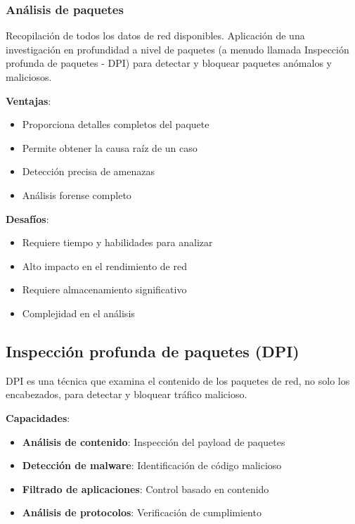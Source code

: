 \subsubsection{Análisis de paquetes}

Recopilación de todos los datos de red disponibles. Aplicación de una investigación en profundidad a nivel de paquetes (a menudo llamada Inspección profunda de paquetes - DPI) para detectar y bloquear paquetes anómalos y maliciosos.

\textbf{Ventajas}:
\begin{itemize}
    \item Proporciona detalles completos del paquete
    \item Permite obtener la causa raíz de un caso
    \item Detección precisa de amenazas
    \item Análisis forense completo
\end{itemize}

\textbf{Desafíos}:
\begin{itemize}
    \item Requiere tiempo y habilidades para analizar
    \item Alto impacto en el rendimiento de red
    \item Requiere almacenamiento significativo
    \item Complejidad en el análisis
\end{itemize}

\subsection{Inspección profunda de paquetes (DPI)}

DPI es una técnica que examina el contenido de los paquetes de red, no solo los encabezados, para detectar y bloquear tráfico malicioso.

\textbf{Capacidades}:
\begin{itemize}
    \item \textbf{Análisis de contenido}: Inspección del payload de paquetes
    \item \textbf{Detección de malware}: Identificación de código malicioso
    \item \textbf{Filtrado de aplicaciones}: Control basado en contenido
    \item \textbf{Análisis de protocolos}: Verificación de cumplimiento
\end{itemize}

